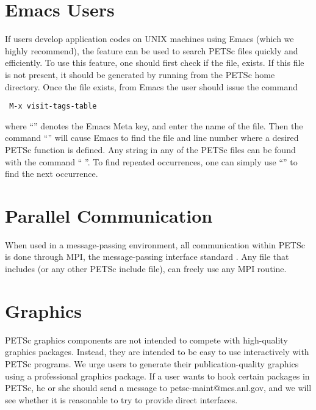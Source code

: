 \section{Emacs Users}  \label{sec:emacs}

 
If users develop application codes on UNIX machines using Emacs (which we
highly recommend), the  feature can be used to search PETSc 
files quickly and efficiently.  To use this feature, one should 
first check if the file,
 exists.  If this file is
not present, it should be generated by
running   from the PETSc home directory. 
Once the file exists, from 
Emacs the user should issue
the command 
\begin{verbatim}
 M-x visit-tags-table
\end{verbatim}
 where ``''
denotes the Emacs Meta key, and enter the 
name of the  file. Then the command ``'' will cause Emacs 
to find the file and line number where a desired PETSc function 
is defined.  Any string in any of the PETSc files can be found with the 
command `` ''. To find repeated occurrences, 
one can simply use ``'' to find the next occurrence.


\section{Parallel Communication}

When used in a message-passing environment, all communication 
within
PETSc is done through MPI, the message-passing interface standard
\cite{MPI-final}.  Any file that includes  (or any other 
PETSc include file), can freely use any MPI routine.

\section{Graphics}

PETSc graphics components are not intended to compete with 
high-quality graphics packages.  Instead, they are intended to be 
easy to use interactively with PETSc programs. We urge users
to generate their publication-quality graphics using a
professional graphics package. If a user wants to hook
certain packages in PETSc, he or she should send a message to 
petsc-maint@mcs.anl.gov, and we will see whether it is reasonable
to try to provide direct interfaces.

